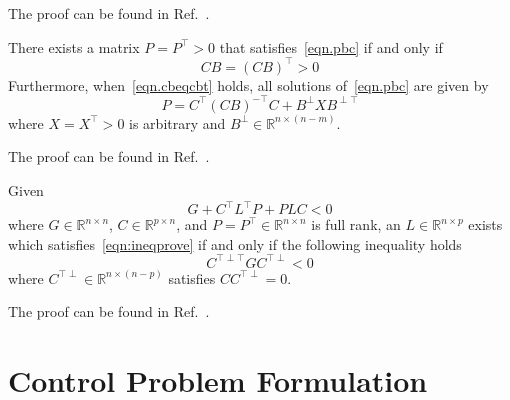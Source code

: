 \documentclass[journal]{IEEEtran}
\theoremstyle{innercustomthm}
\begin{document}
  \begin{proof-dan}
    The proof can be found in Ref.\ \cite{narendra.frequency.1973}.
  \end{proof-dan}

  \begin{cor-dan}
    There exists a matrix $P=P^{\top}>0$ that satisfies\ \eqref{eqn.pbc} if and only if
    \begin{equation}
      \label{eqn.cbeqcbt}
      CB=(CB)^{\top}>0
    \end{equation}
    Furthermore, when\ \eqref{eqn.cbeqcbt} holds, all solutions of\ \eqref{eqn.pbc} are given by
    \begin{equation}
      \label{eqn.Psolutions}
      P=C^{\top}(CB)^{-\top}C+B^{\perp}XB^{\perp\top}
    \end{equation}
    where $X=X^{\top}>0$ is arbitrary and $B^{\perp}\in\mathbb{R}^{n\times(n-m)}$.
  \end{cor-dan}

  \begin{proof-dan}
    The proof can be found in Ref.\ \cite{huang.designspr.1999}.
  \end{proof-dan}

  \begin{lem-dan}\label{lem.elimination}
    Given
    \begin{equation}
      \label{eqn:ineqprove}
      G+C^{\top}L^{\top}P+PLC<0
    \end{equation}
    where $G\in\mathbb{R}^{n\times n}$, $C\in\mathbb{R}^{p\times n}$, and $P=P^{\top}\in\mathbb{R}^{n\times n}$ is full rank, an $L\in\mathbb{R}^{n\times p}$ exists which satisfies\ \eqref{eqn:ineqprove} if and only if the following inequality holds
    \begin{equation*}
      C^{\top\perp\top}GC^{\top\perp}<0
    \end{equation*}
    where $C^{\top\perp}\in\mathbb{R}^{n\times(n-p)}$ satisfies $CC^{\top\perp}=0$.
  \end{lem-dan}

  \begin{proof-dan}
    The proof can be found in Ref.\ \cite{boyd.lmibook.1994}.
  \end{proof-dan}

  \section{Control Problem Formulation}\label{sec.analysisandclassical}
\end{document}
